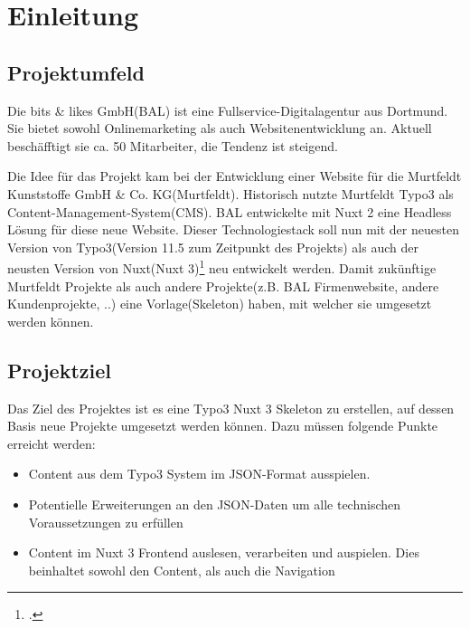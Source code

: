 \section{Einleitung}
\label{sec:Einleitung}


\subsection{Projektumfeld} 
\label{sec:Projektumfeld}
Die bits \& likes GmbH(\acs{BAL}) ist eine Fullservice-Digitalagentur aus Dortmund. Sie bietet sowohl Onlinemarketing als auch Websitenentwicklung an. Aktuell beschäfftigt sie ca. 50 Mitarbeiter, die Tendenz ist steigend.

Die Idee für das Projekt kam bei der Entwicklung einer Website für die Murtfeldt Kunststoffe GmbH \& Co. KG(Murtfeldt). Historisch nutzte Murtfeldt Typo3 als Content-Management-System(\acs{CMS}). \acs{BAL} entwickelte mit Nuxt 2 eine Headless Lösung für diese neue Website. Dieser Technologiestack soll nun mit der neuesten Version von Typo3(Version 11.5 zum Zeitpunkt des Projekts) als auch der neusten Version von Nuxt(Nuxt 3)\footnote{\Vgl \citet{Nuxt3}.} neu entwickelt werden. Damit zukünftige Murtfeldt Projekte als auch andere Projekte(z.B. \acs{BAL} Firmenwebsite, andere Kundenprojekte, ..) eine Vorlage(Skeleton) haben, mit welcher sie umgesetzt werden können.


\subsection{Projektziel} 
\label{sec:Projektziel}
Das Ziel des Projektes ist es eine Typo3 Nuxt 3 Skeleton zu erstellen, auf dessen Basis neue Projekte umgesetzt werden können. Dazu müssen folgende Punkte erreicht werden:
\begin{itemize}
	\item Content aus dem Typo3 System im JSON-Format ausspielen.
	\item Potentielle Erweiterungen an den JSON-Daten um alle technischen Voraussetzungen zu erfüllen
	\item Content im Nuxt 3 Frontend auslesen, verarbeiten und auspielen. Dies beinhaltet sowohl den Content, als auch die Navigation
\end{itemize}

